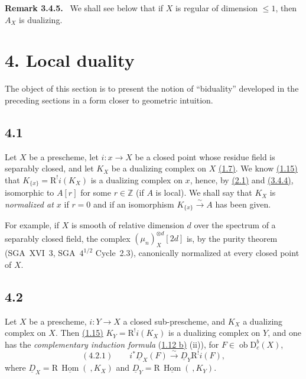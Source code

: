 \documentclass[11pt]{article}
\newenvironment{statement}[1]{\par\medskip\noindent\textbf{#1.}\ }{\par\medskip}
\DeclareMathOperator{\Hom}{Hom}
\newcommand{\R}{\mathrm{R}}
\newcommand{\D}{\mathrm{D}}
\newcommand{\Z}{\mathbb{Z}}
\newcommand{\ob}{\operatorname{ob}}
\providecommand{\Hom}{\operatorname{Hom}}
\providecommand{\ob}{\operatorname{ob}}
\providecommand{\R}{\mathrm R}
\providecommand{\Z}{\mathbb Z}
\providecommand{\Hom}{\operatorname{Hom}}
\begin{document}
\label{sga5:I:remark:3.4.5}\begin{statement}{Remark 3.4.5}
We shall see below that if $X$ is regular of dimension $\le1$, then $A_X$ is dualizing.
\end{statement}

\section*{4. Local duality}\label{sga5:I:section:4}

The object of this section is to present the notion of ``biduality'' developed in the preceding sections in a form closer to geometric intuition.

\subsection*{4.1}\label{sga5:I:subsection:4.1}
Let $X$ be a prescheme, let $i:x\to X$ be a closed point whose residue field is separably closed, and let $K_X$ be a dualizing complex on $X$ \hyperref[sga5:I:definition:1.7]{(1.7)}. We know \hyperref[sga5:I:corollary:1.15]{(1.15)} that $K_{\{x\}}=\R^{!}i(K_X)$ is a dualizing complex on $x$, hence, by \hyperref[sga5:I:theorem:2.1]{(2.1)} and \hyperref[sga5:I:corollary:3.4.4]{(3.4.4)}, isomorphic to $A[r]$ for some $r\in\Z$ (if $A$ is local). We shall say that $K_X$ is \emph{normalized at $x$} if $r=0$ and if an isomorphism $K_{\{x\}}\xrightarrow{\sim}A$ has been given.

For example, if $X$ is smooth of relative dimension $d$ over the spectrum of a separably closed field, the complex $(\mu_n)_X^{\otimes d}[2d]$ is, by the purity theorem (SGA~XVI~3, SGA~$4^{1/2}$ Cycle~2.3), canonically normalized at every closed point of $X$.

\subsection*{4.2}\label{sga5:I:subsection:4.2}
Let $X$ be a prescheme, $i:Y\to X$ a closed sub-prescheme, and $K_X$ a dualizing complex on $X$. Then \hyperref[sga5:I:corollary:1.15]{(1.15)} $K_Y=\R^{!}i(K_X)$ is a dualizing complex on $Y$, and one has the \emph{complementary induction formula} (\hyperref[sga5:I:proposition:1.12]{1.12 b)} (ii)), for $F\in \ob\D_c^b(X)$,
\label{sga5:I:equation:4.2.1}\[
(4.2.1)\qquad i^*\underline{D}_X(F)\xrightarrow{\sim}\underline{D}_Y\R^{!}i(F),
\]
where $\underline{D}_X=\R\,\underline{\Hom}(\ ,K_X)$ and $\underline{D}_Y=\R\,\underline{\Hom}(\ ,K_Y)$.
\end{document}
